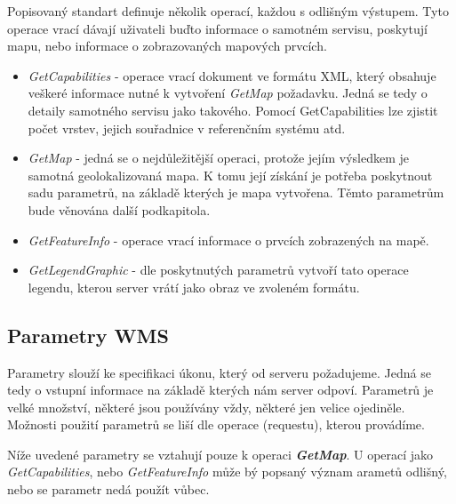Popisovaný standart definuje několik operací, každou s odlišným výstupem. Tyto operace vrací dávají uživateli buďto informace o samotném servisu, poskytují mapu, nebo informace o zobrazovaných mapových prvcích.

\begin{itemize}
	\item\textit{GetCapabilities} - operace vrací dokument ve formátu XML, který obsahuje veškeré informace nutné k vytvoření \textit{GetMap} požadavku. Jedná se tedy o detaily samotného servisu jako takového. Pomocí GetCapabilities lze zjistit počet vrstev, jejich souřadnice v referenčním systému atd. 
	
	\item\textit{GetMap} - jedná se o nejdůležitější operaci, protože jejím výsledkem je samotná geolokalizovaná mapa. K tomu její získání je potřeba poskytnout sadu parametrů, na základě kterých je mapa vytvořena. Těmto parametrům bude věnována další podkapitola. 
	
	\item\textit{GetFeatureInfo} - operace vrací informace o prvcích zobrazených na mapě.
	
	\item\textit{GetLegendGraphic} - dle poskytnutých parametrů vytvoří tato operace legendu, kterou server vrátí jako obraz ve zvoleném formátu.
\end{itemize}

\subsection{Parametry WMS}
Parametry slouží ke specifikaci úkonu, který od serveru požadujeme. Jedná se tedy o vstupní informace na základě kterých nám server odpoví. Parametrů je velké množství, některé jsou používány vždy, některé jen velice ojediněle. Možnosti použití parametrů se liší dle operace (requestu), kterou provádíme. 

Níže uvedené parametry se vztahují pouze k operaci \textbf{\textit{GetMap}}. U operací jako \textit{GetCapabilities}, nebo \textit{GetFeatureInfo} může bý popsaný význam arametů odlišný, nebo se parametr nedá použít vůbec.


